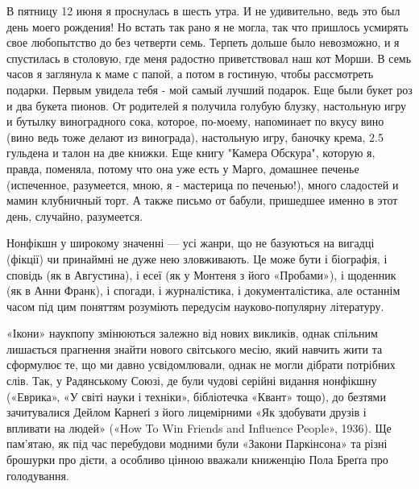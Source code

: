 \begin{multicols}{2}
В пятницу 12 июня я проснулась в шесть утра. И не удивительно, ведь это
был день  моего  рождения! Но встать  так  рано я не могла, так что пришлось
усмирять  свое  любопытство  до  без  четверти  семь.  Терпеть  дольше  было
невозможно, и я  спустилась в столовую, где меня радостно приветствовал  наш
кот Морши.  В семь часов  я  заглянула  к маме с папой, а потом  в гостиную,
чтобы рассмотреть подарки. Первым увидела тебя -  мой самый  лучший подарок.
Еще были букет  роз  и  два букета пионов. От родителей  я получила  голубую
блузку, настольную игру  и  бутылку виноградного  сока,  которое,  по-моему,
напоминает по вкусу  вино  (вино ведь  тоже делают из винограда), настольную
игру, баночку крема, 2.5 гульдена и талон на две  книжки.  Еще книгу "Камера
Обскура",  которую  я, правда,  поменяла, потому что она уже  есть у  Марго,
домашнее печенье (испеченное, разумеется, мною, я - мастерица по печенью!),
много сладостей и мамин клубничный торт. А также письмо от бабули, пришедшее
именно в этот день, случайно, разумеется.

\end{multicols}

\zzrule

Нонфікшн у широкому значенні — усі жанри, що не базуються на вигадці (фікції)
чи принаймні не дуже нею зловживають. Це може бути і біографія, і сповідь (як в
Августина), і есеї (як у Монтеня з його «Пробами»), і щоденник (як в Анни
Франк), і спогади, і журналістика, і документалістика, але останнім часом під
цим поняттям розуміють передусім науково-популярну літературу.

«Ікони» наукпопу змінюються залежно від нових викликів, однак спільним
лишається прагнення знайти нового світського месію, який навчить жити та
сформулює те, що ми давно усвідомлювали, однак не могли дібрати потрібних слів.
Так, у Радянському Союзі, де були чудові серійні видання нонфікшну («Еврика»,
«У світі науки і техніки», бібліотечка «Квант» тощо), до безтями зачитувалися
Дейлом Карнеґі з його лицемірними «Як здобувати друзів і впливати на людей»
(«How To Win Friends and Influence People», 1936). Ще пам’ятаю, як під час
перебудови модними були «Закони Паркінсона» та різні брошурки про дієти, а
особливо цінною вважали книженцію Пола Бреґґа про голодування.

